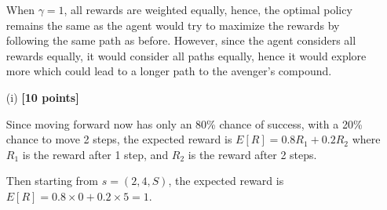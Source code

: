 \begin{solution}
\begin{enumerate}
    When $\gamma = 1$, all rewards are weighted equally, hence, the optimal policy remains the same as the agent would try to maximize the rewards by following the same path as before. However, since the agent considers all rewards equally, it would consider all paths equally, hence it would explore more which could lead to a longer path to the avenger's compound.

    \item[(i)] \textbf{[10 points]}
    
    Since moving forward now has only an 80\% chance of success, with a 20\% chance to move 2 steps, the expected reward is $ E[R] = 0.8R_1 + 0.2R_2 $ where $ R_1 $ is the reward after 1 step, and $ R_2 $ is the reward after 2 steps. 

    Then starting from $ s = (2, 4, S) $, the expected reward is $ E[R] = 0.8 \times 0 + 0.2 \times 5 = 1 $.
\end{enumerate}
\end{solution}
